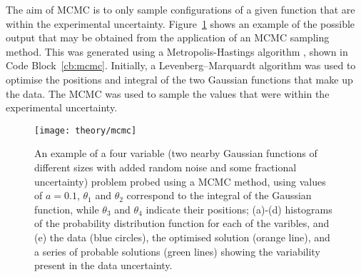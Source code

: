 The aim of MCMC is to only sample configurations of a given function that are within the experimental uncertainty.
Figure~\ref{fig:mcmc} shows an example of the possible output that may be obtained from the application of an MCMC sampling method.
This was generated using a Metropolis-Hastings algorithm \cite{metropolis_equation_1953,hastings_monte_1970}, shown in Code Block~\ref{cb:mcmc}.
Initially, a Levenberg–Marquardt algorithm \cite{levenberg_method_1944,marquardt_algorithm_1963} was used to optimise the positions and integral of the two Gaussian functions that make up the data.
The MCMC was used to sample the values that were within the experimental uncertainty.
%
\begin{figure}
    \centering
    \texttt{[image: theory/mcmc]}
    \caption{An example of a four variable (two nearby Gaussian functions of different sizes with added random noise and some fractional uncertainty) problem probed using a MCMC method, using values of $a=0.1$, $\theta_1$ and $\theta_2$ correspond to the integral of the Gaussian function, while $\theta_3$ and $\theta_4$ indicate their positions; (a)-(d) histograms of the probability distribution function for each of the varibles, and (e) the data (blue circles), the optimised solution (orange line), and a series of probable solutions (green lines) showing the variability present in the data uncertainty.}
    \label{fig:mcmc}
\end{figure}
%
\begin{figure}
    \centering
        
\end{figure}
%

